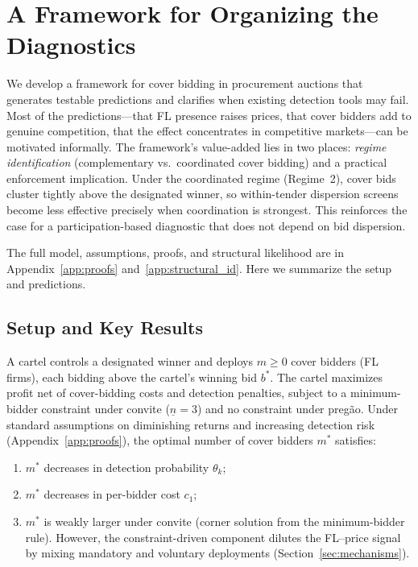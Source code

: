 
\section{A Framework for Organizing the Diagnostics}
\label{sec:structural}

We develop a framework for cover bidding in procurement auctions that
generates testable predictions and clarifies when existing detection
tools may fail. Most of the predictions---that FL presence raises
prices, that cover bidders add to genuine competition, that the effect
concentrates in competitive markets---can be motivated informally. The
framework's value-added lies in two places: \emph{regime
identification} (complementary vs.\ coordinated cover bidding) and a
practical enforcement implication. Under the coordinated regime
(Regime~2), cover bids cluster tightly above the designated winner,
so within-tender dispersion screens become less effective precisely
when coordination is strongest. This reinforces the case for a
participation-based diagnostic that does not depend on bid dispersion.

The full model, assumptions, proofs, and structural likelihood are in
Appendix~\ref{app:proofs} and~\ref{app:structural_id}. Here we
summarize the setup and predictions.

\subsection{Setup and Key Results}

A cartel controls a designated winner and deploys $m \geq 0$ cover
bidders (FL firms), each bidding above the cartel's winning bid
$b^*$. The cartel maximizes profit net of cover-bidding costs and
detection penalties, subject to a minimum-bidder constraint under
convite ($\underline{n} = 3$) and no constraint under preg\~ao.
Under standard assumptions on diminishing returns and increasing
detection risk (Appendix~\ref{app:proofs}), the optimal number of
cover bidders $m^*$ satisfies:
\begin{enumerate}
  \item[(i)] $m^*$ decreases in detection probability $\theta_k$;
  \item[(ii)] $m^*$ decreases in per-bidder cost $c_1$;
  \item[(iii)] $m^*$ is weakly larger under convite (corner solution
    from the minimum-bidder rule). However, the constraint-driven
    component dilutes the FL--price signal by mixing mandatory and
    voluntary deployments (Section~\ref{sec:mechanisms}).
\end{enumerate}

